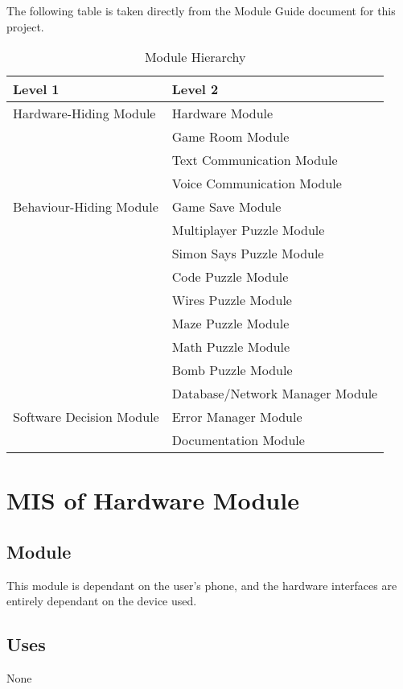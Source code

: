\documentclass[12pt, titlepage]{article}
\begin{document}
The following table is taken directly from the Module Guide document for this project.

\begin{table}[h!]
\centering
\begin{tabular}{p{} p{}}
\toprule
\textbf{Level 1} & \textbf{Level 2}\\
\midrule

{Hardware-Hiding Module} & Hardware Module \\
\midrule

\multirow{7}{0.3\textwidth}{Behaviour-Hiding Module}
& Game Room Module\\
& Text Communication Module\\
& Voice Communication Module\\
& Game Save Module\\
& Multiplayer Puzzle Module\\
& Simon Says Puzzle Module\\
& Code Puzzle Module\\
& Wires Puzzle Module\\
& Maze Puzzle Module\\
& Math Puzzle Module\\
& Bomb Puzzle Module\\
\midrule

\multirow{3}{0.3\textwidth}{Software Decision Module} & Database/Network Manager Module\\
& Error Manager Module\\
& Documentation Module\\
\bottomrule

\end{tabular}
\caption{Module Hierarchy}
\label{TblMH}
\end{table}

\newpage

\section{MIS of {Hardware Module}} \label{HardwareModule} 

\subsection{Module}

This module is dependant on the user's phone, and the hardware interfaces are entirely dependant on the device used. 

\subsection{Uses}
 None
\end{document}

